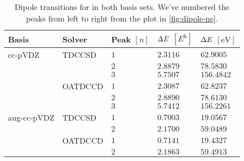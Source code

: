         \begin{table}
            \centering
            \caption{Dipole transitions for  in both basis sets.
            We've numbered the peaks from left to right from the plot in
            \autoref{fig:dipole-ne}.}
            \renewcommand{\arraystretch}{1.3}
            \begin{tabular}{@{}lllll@{}}
                \toprule
                Basis & Solver & Peak $[n]$
                & $\Delta E$ $[\si{\hartree}]$
                & $\Delta E$ $[\si{\electronvolt}]$
                \\
                \midrule
                cc-pVDZ & TDCCSD & $1$ & $2.3116$ & $62.9005$ \\
                & & $2$ & $2.8879$ & $78.5830$ \\
                & & $3$ & $5.7507$ & $156.4842$ \\
                & OATDCCD & $1$ & $2.3087$ & $62.8237$ \\
                & & $2$ & $2.8890$ & $78.6130$ \\
                & & $3$ & $5.7412$ & $156.2261$ \\
                aug-cc-pVDZ & TDCCSD & $1$ & $0.7003$ & $19.0567$ \\
                & & $2$ & $2.1700$ & $59.0489$ \\
                & OATDCCD & $1$ & $0.7141$ & $19.4327$ \\
                & & $2$ & $2.1863$ & $59.4913$ \\
                \bottomrule
            \end{tabular}
            \label{tab:dipole-ne}
        \end{table}

